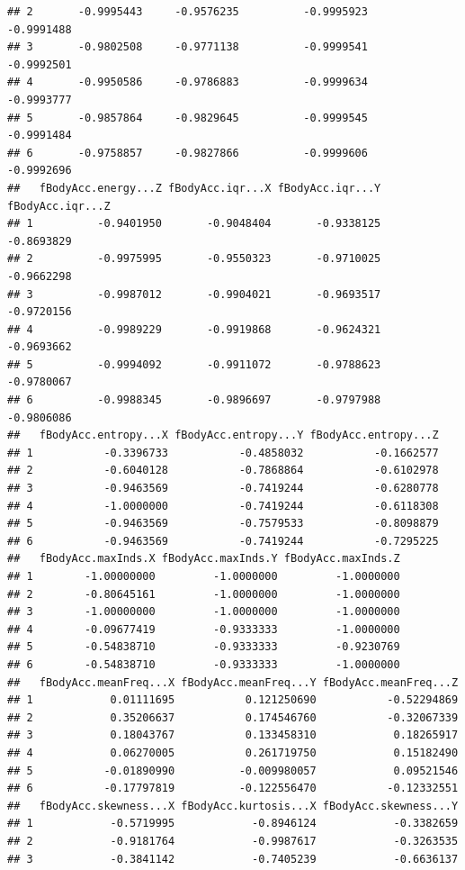 \documentclass[
]{article}
\begin{document}
\begin{verbatim}
## 2       -0.9995443     -0.9576235          -0.9995923          -0.9991488
## 3       -0.9802508     -0.9771138          -0.9999541          -0.9992501
## 4       -0.9950586     -0.9786883          -0.9999634          -0.9993777
## 5       -0.9857864     -0.9829645          -0.9999545          -0.9991484
## 6       -0.9758857     -0.9827866          -0.9999606          -0.9992696
##   fBodyAcc.energy...Z fBodyAcc.iqr...X fBodyAcc.iqr...Y fBodyAcc.iqr...Z
## 1          -0.9401950       -0.9048404       -0.9338125       -0.8693829
## 2          -0.9975995       -0.9550323       -0.9710025       -0.9662298
## 3          -0.9987012       -0.9904021       -0.9693517       -0.9720156
## 4          -0.9989229       -0.9919868       -0.9624321       -0.9693662
## 5          -0.9994092       -0.9911072       -0.9788623       -0.9780067
## 6          -0.9988345       -0.9896697       -0.9797988       -0.9806086
##   fBodyAcc.entropy...X fBodyAcc.entropy...Y fBodyAcc.entropy...Z
## 1           -0.3396733           -0.4858032           -0.1662577
## 2           -0.6040128           -0.7868864           -0.6102978
## 3           -0.9463569           -0.7419244           -0.6280778
## 4           -1.0000000           -0.7419244           -0.6118308
## 5           -0.9463569           -0.7579533           -0.8098879
## 6           -0.9463569           -0.7419244           -0.7295225
##   fBodyAcc.maxInds.X fBodyAcc.maxInds.Y fBodyAcc.maxInds.Z
## 1        -1.00000000         -1.0000000         -1.0000000
## 2        -0.80645161         -1.0000000         -1.0000000
## 3        -1.00000000         -1.0000000         -1.0000000
## 4        -0.09677419         -0.9333333         -1.0000000
## 5        -0.54838710         -0.9333333         -0.9230769
## 6        -0.54838710         -0.9333333         -1.0000000
##   fBodyAcc.meanFreq...X fBodyAcc.meanFreq...Y fBodyAcc.meanFreq...Z
## 1            0.01111695           0.121250690           -0.52294869
## 2            0.35206637           0.174546760           -0.32067339
## 3            0.18043767           0.133458310            0.18265917
## 4            0.06270005           0.261719750            0.15182490
## 5           -0.01890990          -0.009980057            0.09521546
## 6           -0.17797819          -0.122556470           -0.12332551
##   fBodyAcc.skewness...X fBodyAcc.kurtosis...X fBodyAcc.skewness...Y
## 1            -0.5719995            -0.8946124            -0.3382659
## 2            -0.9181764            -0.9987617            -0.3263535
## 3            -0.3841142            -0.7405239            -0.6636137

\end{verbatim}
\end{document}
